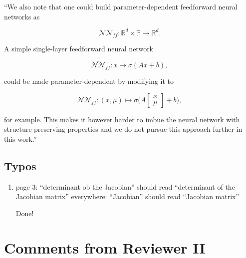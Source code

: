 \documentclass{article}
\begin{document}
\begin{enumerate}
{        ``We also note that one could build parameter-dependent feedforward neural networks as

        \begin{equation*}
        \mathcal{NN}_{ff}:\mathbb{R}^d\times\mathbb{P} \to \mathbb{R}^d.
        \end{equation*}
        
        A simple single-layer feedforward neural network
        
        \begin{equation*}
            \overline{\mathcal{NN}}_{ff}: x \mapsto \sigma(Ax + b),
        \end{equation*}
        
        could be made parameter-dependent by modifying it to
        
        \begin{equation*}
            \mathcal{NN}_{ff}: (x, \mu) \mapsto \sigma\Big(A\begin{bmatrix}x \\ \mu \end{bmatrix} + b\Big),
        \end{equation*}
        
        for example. This makes it however harder to imbue the neural network with structure-preserving properties and we do not pursue this approach further in this work.''}
\end{enumerate}

\subsection*{Typos}
\begin{enumerate}
    \item page 3: ``determinant ob the Jacobian'' should read ``determinant of the Jacobian matrix'' everywhere: ``Jacobian'' should read ``Jacobian matrix''
    
    {\color{mred} Done!}
\end{enumerate}

\section{Comments from Reviewer II}
\end{document}
